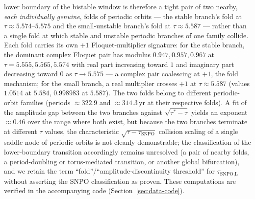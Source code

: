 \documentclass[twocolumn,10pt]{article}
\begin{document}
lower boundary of the bistable window is therefore a tight pair of two nearby, \emph{each individually genuine}, folds of periodic orbits --- the stable branch's fold at $\tau\approx5.574$--$5.575$ and the small-unstable branch's fold at $\tau\approx5.587$ --- rather than a single fold at which stable and unstable periodic branches of one family collide. Each fold carries its own $+1$ Floquet-multiplier signature: for the stable branch, the dominant complex Floquet pair has modulus $0.947, 0.957, 0.967$ at $\tau=5.555, 5.565, 5.574$ with real part increasing toward $1$ and imaginary part decreasing toward $0$ as $\tau\to5.575$ --- a complex pair coalescing at $+1$, the fold mechanism; for the small branch, a real multiplier crosses $+1$ at $\tau\approx5.587$ (values $1.0514$ at $5.584$, $0.998983$ at $5.587$). The two folds belong to different periodic-orbit families (periods $\approx322.9$ and $\approx314.3$\,yr at their respective folds). A fit of the amplitude gap between the two branches against $\sqrt{\tau^*-\tau}$ yields an exponent $\approx0.46$ over the range where both exist, but because the two branches terminate at different $\tau$ values, the characteristic $\sqrt{\tau-\tau_{\text{SNPO}}}$ collision scaling of a single saddle-node of periodic orbits is not cleanly demonstrable; the classification of the lower-boundary transition accordingly remains unresolved (a pair of nearby folds, a period-doubling or torus-mediated transition, or another global bifurcation), and we retain the term ``fold''/``amplitude-discontinuity threshold'' for $\tau_{\text{SNPO,L}}$ without asserting the SNPO classification as proven. These computations are verified in the accompanying code (Section~\ref{sec:data-code}).
\end{document}
